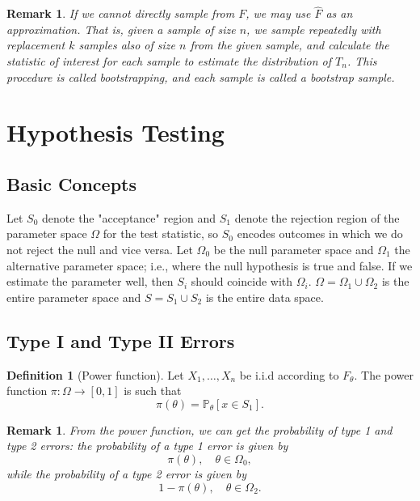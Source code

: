 \documentclass{tufte-handout}
\renewcommand{\P}{\mathbb{P}}
\newtheorem{rmk}[thm]{Remark}
\theoremstyle{definition}
\newtheorem{defn}[thm]{Definition}
\begin{document}
\begin{rmk}
	If we cannot directly sample from $F$, we may use $\hat{F}$ as an approximation. That is, given a sample of size $n$, we sample repeatedly with replacement $k$ samples also of size $n$ from the given sample, and calculate the statistic of interest for each sample to estimate the distribution of $T_n$. This procedure is called bootstrapping, and each sample is called a bootstrap sample.
\end{rmk}


\section{Hypothesis Testing}
\subsection{Basic Concepts}

Let $S_0$ denote the "acceptance" region and $S_1$ denote the rejection region of the parameter space $\Omega$ for the test statistic, so $S_0$ encodes outcomes in which we do not reject the null and vice versa. Let $\Omega_0$ be the null parameter space and $\Omega_1$ the alternative parameter space; i.e., where the null hypothesis is true and false. If we estimate the parameter well, then $S_i$ should coincide with $\Omega_i$. $\Omega = \Omega_1 \cup \Omega_2$ is the entire parameter space and $S = S_1\cup S_2$ is the entire data space.

\subsection{Type I and Type II Errors}


\begin{defn}[Power function]
	Let $X_1,\ldots,X_n$ be i.i.d according to $F_\theta$. The power function $\pi: \Omega\to [0,1]$ is such that \[
		\pi(\theta) = \P_\theta\left[ x \in S_1 \right] 
	.\] 
\end{defn}
\begin{rmk}
	From the power function, we can get the probability of type 1 and type 2 errors: the probability of a type 1 error is given by \[
		\pi(\theta), \quad \theta \in \Omega_0
	,\] while the probability of a type 2 error is given by \[
		1-\pi(\theta), \quad \theta \in \Omega_2
	.\] 
\end{rmk}
\end{document}
